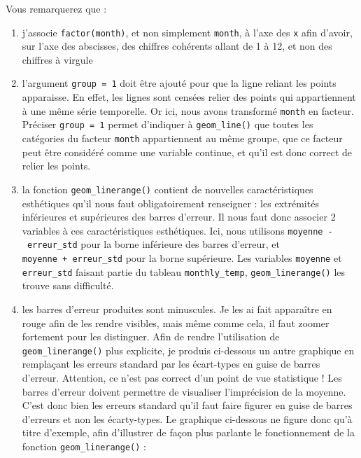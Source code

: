 \documentclass[a4paperpaper,]{article}
\providecommand{\tightlist}{%
  \setlength{\itemsep}{0pt}\setlength{\parskip}{0pt}}
\theoremstyle{definition}
\theoremstyle{definition}
\theoremstyle{definition}
\theoremstyle{remark}
\begin{document}
Vous remarquerez que :

\begin{enumerate}
\def\labelenumi{\arabic{enumi}.}
\tightlist
\item
  j'associe \texttt{factor(month)}, et non simplement \texttt{month}, à
  l'axe des \texttt{x} afin d'avoir, sur l'axe des abscisses, des
  chiffres cohérents allant de 1 à 12, et non des chiffres à virgule
\item
  l'argument \texttt{group\ =\ 1} doit être ajouté pour que la ligne
  reliant les points apparaisse. En effet, les lignes sont censées
  relier des points qui appartiennent à une même série temporelle. Or
  ici, nous avons transformé \texttt{month} en facteur. Préciser
  \texttt{group\ =\ 1} permet d'indiquer à \texttt{geom\_line()} que
  toutes les catégories du facteur \texttt{month} appartiennent au même
  groupe, que ce facteur peut être considéré comme une variable
  continue, et qu'il est donc correct de relier les points.
\item
  la fonction \texttt{geom\_linerange()} contient de nouvelles
  caractéristiques esthétiques qu'il nous faut obligatoirement
  renseigner : les extrémités inférieures et supérieures des barres
  d'erreur. Il nous faut donc associer 2 variables à ces
  caractéristiques esthétiques. Ici, nous utilisons
  \texttt{moyenne\ -\ erreur\_std} pour la borne inférieure des barres
  d'erreur, et \texttt{moyenne\ +\ erreur\_std} pour la borne
  supérieure. Les variables \texttt{moyenne} et \texttt{erreur\_std}
  faisant partie du tableau \texttt{monthly\_temp},
  \texttt{geom\_linerange()} les trouve sans difficulté.
\item
  les barres d'erreur produites sont minuscules. Je les ai fait
  apparaître en rouge afin de les rendre visibles, mais même comme cela,
  il faut zoomer fortement pour les distinguer. Afin de rendre
  l'utilisation de \texttt{geom\_linerange()} plus explicite, je produis
  ci-dessous un autre graphique en remplaçant les erreurs standard par
  les écart-types en guise de barres d'erreur. Attention, ce n'est pas
  correct d'un point de vue statistique ! Les barres d'erreur doivent
  permettre de visualiser l'imprécision de la moyenne. C'est donc bien
  les erreurs standard qu'il faut faire figurer en guise de barres
  d'erreurs et non les écarty-types. Le graphique ci-dessous ne figure
  donc qu'à titre d'exemple, afin d'illustrer de façon plus parlante le
  fonctionnement de la fonction \texttt{geom\_linerange()} :
\end{enumerate}
\end{document}
